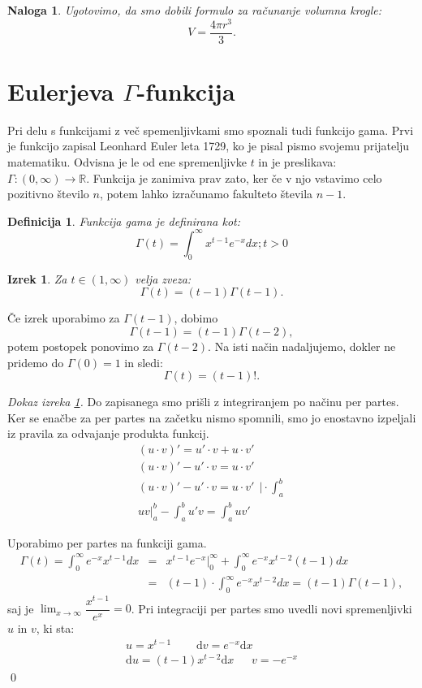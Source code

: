 \documentclass[12pt, a4paper]{article}
\newtheorem{izrek}{Izrek}
\newtheorem{definicija}{Definicija}
\newtheorem{naloga}{Naloga}
\begin{document}
\begin{naloga}
\emph
{Ugotovimo, da smo dobili formulo za računanje volumna krogle:}
$$
V=\frac{4\pi r^3}{3} .
$$
\end{naloga}


\section{Eulerjeva $\Gamma $-funkcija}

Pri delu s funkcijami z več spemenljivkami smo spoznali tudi funkcijo gama. Prvi je funkcijo zapisal Leonhard Euler leta 1729, ko je pisal pismo svojemu prijatelju matematiku. Odvisna je le od ene spremenljivke $t$ in je preslikava: 
$ \Gamma: (0, \infty) \rightarrow \mathbb{R} $. Funkcija je zanimiva prav zato, ker če v njo vstavimo celo pozitivno število $n$, potem lahko izračunamo fakulteto števila $n-1$.
\begin{definicija}
Funkcija gama je definirana kot:
\[ \Gamma (t) = \int^{\infty}_{0} x^{t-1} e^{-x} dx ; t > 0 \]
\end{definicija}

\begin{izrek} 
\label{izrek:enacbazagamo}
Za $t \in (1, \infty)$ velja zveza:
\[ \Gamma (t) = (t - 1) \Gamma (t-1). \] 

\end{izrek}
Če izrek uporabimo za $ \Gamma (t-1) $, dobimo  $$ \Gamma (t-1) = (t-1) \Gamma (t-2),$$ potem postopek ponovimo za $\Gamma (t-2)$. Na isti način nadaljujemo, dokler ne pridemo do $\Gamma (0) = 1$ in sledi:
\[ \Gamma (t) = (t-1)!. \]

\emph{Dokaz izreka \ref{izrek:enacbazagamo}.}
Do zapisanega smo prišli z integriranjem po načinu per partes. Ker se enačbe za per partes na začetku nismo spomnili, smo jo enostavno izpeljali iz pravila za odvajanje produkta funkcij.
\begin{eqnarray*}
 (u \cdot v)' = u' \cdot v + u \cdot v' \\
(u \cdot v)' - u' \cdot v =  u \cdot v' \\
(u \cdot v)' - u' \cdot v =  u \cdot v' ~~ \Big| \cdot \int^{b}_{a} \\
uv \Big|^{b}_{a} - \int^{b}_{a} u'v = \int^{b}_{a} uv' 
\end{eqnarray*}

Uporabimo per partes na funkciji gama.
\begin{eqnarray*} 
\Gamma (t) = \int^{\infty}_{0} e^{-x} x^{t-1} dx &=& x^{t-1} e^{-x} \Big|^{\infty}_{0} + \int^{\infty}_{0} e^{-x} x^{t-2} (t-1) dx \\
&=&  (t-1) \cdot \int^{\infty}_{0} e^{-x} x^{t-2} dx = (t-1) \Gamma (t-1), 
\end{eqnarray*}
saj je $ \lim_{x \to \infty} \dfrac{x^{t-1}}{e^x} = 0 $. Pri integraciji per partes smo uvedli novi spremenljivki $u$ in $v$,  ki sta:
\begin{eqnarray*}
u = x^{t-1} ~~~~~~~~~~ \mathrm{d}v = e^{-x} \mathrm{d}x \\
\mathrm{d}u = (t-1) x^{t-2} \mathrm{d}x  ~~~~~~~ v = -e^{-x}
\end{eqnarray*} \qed
\end{document}
